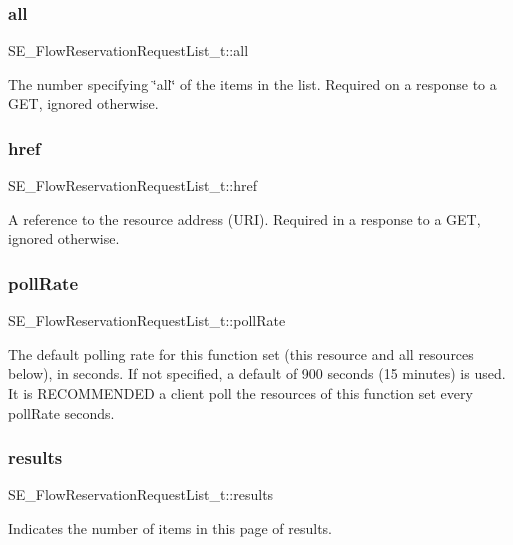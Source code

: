 \subsubsection{\texorpdfstring{all}{all}}
{\footnotesize\ttfamily S\+E\+\_\+\+Flow\+Reservation\+Request\+List\+\_\+t\+::all}

The number specifying \char`\"{}all\char`\"{} of the items in the list. Required on a response to a G\+ET, ignored otherwise. \mbox{\label{group__FlowReservationRequestList_ga4b986404c45f6995659822cc30a09aeb}} 
\subsubsection{\texorpdfstring{href}{href}}
{\footnotesize\ttfamily S\+E\+\_\+\+Flow\+Reservation\+Request\+List\+\_\+t\+::href}

A reference to the resource address (U\+RI). Required in a response to a G\+ET, ignored otherwise. \mbox{\label{group__FlowReservationRequestList_gae849ed542c4f144ffebb5351e300807c}} 
\subsubsection{\texorpdfstring{poll\+Rate}{pollRate}}
{\footnotesize\ttfamily S\+E\+\_\+\+Flow\+Reservation\+Request\+List\+\_\+t\+::poll\+Rate}

The default polling rate for this function set (this resource and all resources below), in seconds. If not specified, a default of 900 seconds (15 minutes) is used. It is R\+E\+C\+O\+M\+M\+E\+N\+D\+ED a client poll the resources of this function set every poll\+Rate seconds. \mbox{\label{group__FlowReservationRequestList_ga15c8b02101d4721254fb56573632a332}} 
\subsubsection{\texorpdfstring{results}{results}}
{\footnotesize\ttfamily S\+E\+\_\+\+Flow\+Reservation\+Request\+List\+\_\+t\+::results}

Indicates the number of items in this page of results. 